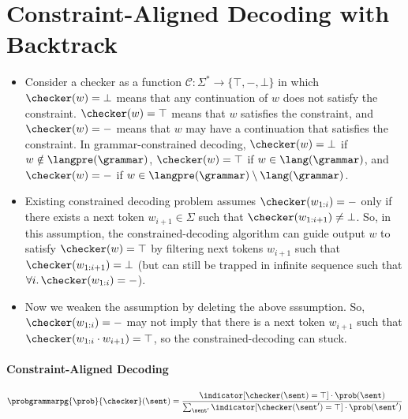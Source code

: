 \section{Constraint-Aligned Decoding with Backtrack}\label{sec:problem}

\begin{itemize}
\item Consider a checker as a function $\mathcal{C}: \Sigma^\ast \rightarrow \{\top, -, \bot\}$ in which $\checker(w) = \bot$ means that any continuation of $w$ does not satisfy the constraint. $\checker(w) = \top$ means that $w$ satisfies the constraint, and $\checker(w) = -$ means that $w$ may have a continuation that satisfies the constraint. 
In grammar-constrained decoding, $\checker(w) = \bot$ if $w \notin \langpre(\grammar)$, $\checker(w) = \top$ if $w \in \lang(\grammar)$, 
and $\checker(w) = -$ if $w \in \langpre(\grammar) \setminus \lang(\grammar)$.

\item Existing constrained decoding problem assumes $\checker(w_{1:i}) = -$ only if 
there exists a next token $w_{i+1} \in \Sigma$ such that $\checker(w_{1:i+1}) \neq \bot$.
So, in this assumption, the constrained-decoding algorithm can guide output $w$ to satisfy $\checker(w) = \top$ by filtering next tokens $w_{i+1}$ such that $\checker(w_{1:i+1}) = \bot$
(but can still be trapped in infinite sequence such that $\forall i.\, \checker(w_{1:i}) = -$).

\item Now we weaken the assumption by deleting the above sssumption. So, $\checker(w_{1:i}) = -$ may not imply that there is a next token $w_{i+1}$ such that $\checker(w_{1:i} \cdot w_{i+1}) = \top$, so the constrained-decoding can stuck. 
\end{itemize}

\paragraph{Constraint-Aligned Decoding}
\[
\probgrammarpg{\prob}{\checker}(\sent)  = \frac{\indicator[\checker(\sent) = \top] \cdot \prob(\sent)}{\sum_{\sent'} \indicator[\checker(\sent') = \top] \cdot \prob(\sent')}
\]

